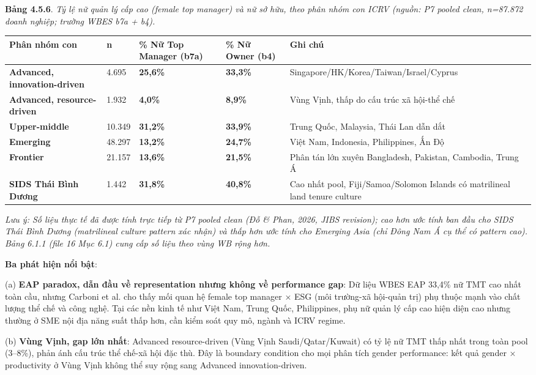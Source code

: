 \documentclass[12pt,a4paper]{article}
\begin{document}
\textbf{Bảng 4.5.6}. \emph{Tỷ lệ nữ quản lý cấp cao (female top manager)
và nữ sở hữu, theo phân nhóm con ICRV (nguồn: P7 pooled clean, n=87.872
doanh nghiệp; trường WBES b7a + b4).}

\begin{longtable}[]{@{}lllll@{}}
\toprule\noalign{}
Phân nhóm con & n & \% Nữ Top Manager (b7a) & \% Nữ Owner (b4) & Ghi
chú \\
\midrule\noalign{}
\endhead
\bottomrule\noalign{}
\endlastfoot
\textbf{Advanced, innovation-driven} & 4.695 & \textbf{25,6\%} &
\textbf{33,3\%} & Singapore/HK/Korea/Taiwan/Israel/Cyprus \\
\textbf{Advanced, resource-driven} & 1.932 & \textbf{4,0\%} &
\textbf{8,9\%} & Vùng Vịnh, thấp do cấu trúc xã hội-thể chế \\
\textbf{Upper-middle} & 10.349 & \textbf{31,2\%} & \textbf{33,9\%} &
Trung Quốc, Malaysia, Thái Lan dẫn dắt \\
\textbf{Emerging} & 48.297 & \textbf{13,2\%} & \textbf{24,7\%} & Việt
Nam, Indonesia, Philippines, Ấn Độ \\
\textbf{Frontier} & 21.157 & \textbf{13,6\%} & \textbf{21,5\%} & Phân
tán lớn xuyên Bangladesh, Pakistan, Cambodia, Trung Á \\
\textbf{SIDS Thái Bình Dương} & 1.442 & \textbf{31,8\%} &
\textbf{40,8\%} & Cao nhất pool, Fiji/Samoa/Solomon Islands có
matrilineal land tenure culture \\
\end{longtable}

\emph{Lưu ý: Số liệu thực tế đã được tính trực tiếp từ P7 pooled clean
(Đỗ \& Phan, 2026, JIBS revision); cao hơn ước tính ban đầu cho SIDS
Thái Bình Dương (matrilineal culture pattern xác nhận) và thấp hơn ước
tính cho Emerging Asia (chỉ Đông Nam Á cụ thể có pattern cao). Bảng
6.1.1 (file 16 Mục 6.1) cung cấp số liệu theo vùng WB rộng hơn.}

\textbf{Ba phát hiện nổi bật}:

(a) \textbf{EAP paradox, dẫn đầu về representation nhưng không về
performance gap}: Dữ liệu WBES EAP 33,4\% nữ TMT cao nhất toàn cầu,
nhưng Carboni et al. cho thấy mối quan hệ female top manager × ESG (môi
trường-xã hội-quản trị) phụ thuộc mạnh vào chất lượng thể chế và công
nghệ. Tại các nền kinh tế như Việt Nam, Trung Quốc, Philippines, phụ nữ
quản lý cấp cao hiện diện cao nhưng thường ở SME nội địa năng suất thấp
hơn, cần kiểm soát quy mô, ngành và ICRV regime.

(b) \textbf{Vùng Vịnh, gap lớn nhất}: Advanced resource-driven (Vùng
Vịnh Saudi/Qatar/Kuwait) có tỷ lệ nữ TMT thấp nhất trong toàn pool
(3--8\%), phản ánh cấu trúc thể chế-xã hội đặc thù. Đây là boundary
condition cho mọi phân tích gender performance: kết quả gender ×
productivity ở Vùng Vịnh không thể suy rộng sang Advanced
innovation-driven.
\end{document}
